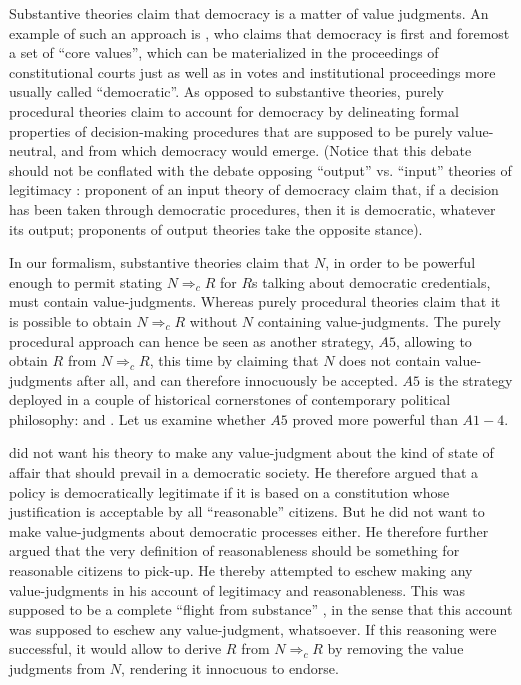 \documentclass[preprint, french, english, 11pt, authoryear]{elsarticle}%
\begin{document}
Substantive theories claim that democracy is a matter of value judgments. An example of such an approach is \cite{brettschneider_value_2006}, who claims that democracy is first and foremost a set of “core values”, which can be materialized in the proceedings of constitutional courts just as well as in votes and institutional proceedings more usually called “democratic”. As opposed to substantive theories, purely procedural theories claim to account for democracy by delineating formal properties of decision-making procedures that are supposed to be purely value-neutral, and from which democracy would emerge. (Notice that this debate should not be conflated with the debate opposing “output” vs. “input” theories of legitimacy \citep{vatn_environmental_2016, backstrand_environmental_2010}: proponent of an input theory of democracy claim that, if a decision has been taken through democratic procedures, then it is democratic, whatever its output; proponents of output theories take the opposite stance).

In our formalism, substantive theories claim that $N$, in order to be powerful enough to permit stating $N ⇒_c R$ for $R$s talking about democratic credentials, must contain value-judgments. Whereas purely procedural theories claim that it is possible to obtain $N ⇒_c R$ without $N$ containing value-judgments. The purely procedural approach can hence be seen as another strategy, $A5$, allowing to obtain $R$ from $N ⇒_c R$, this time by claiming that $N$ does not contain value-judgments after all, and can therefore innocuously be accepted. $A5$ is the strategy deployed in a couple of historical cornerstones of contemporary political philosophy: \cite{rawls_political_2005} and \cite{habermas_moralbewustsein_1983}. Let us examine whether $A5$ proved more powerful than $A1-4$.

\cite{rawls_political_2005} did not want his theory to make any value-judgment about the kind of state of affair that should prevail in a democratic society. He therefore argued that a policy is democratically legitimate if it is based on a constitution whose justification is acceptable by all  “reasonable” citizens. But he did not want to make value-judgments about democratic processes either. He therefore further argued that the very definition of reasonableness should be something for reasonable citizens to pick-up. He thereby attempted to eschew making any value-judgments in his account of legitimacy and reasonableness. This was supposed to be a complete ``flight from substance'' \citep{estlund_democratic_2009}, in the sense that this account was supposed to eschew any value-judgment, whatsoever. If this reasoning were successful, it would allow to derive $R$ from $N ⇒_c R$ by removing the value judgments from $N$, rendering it innocuous to endorse.
\end{document}
